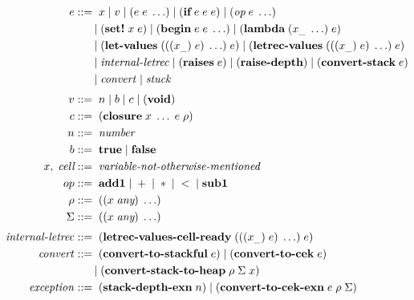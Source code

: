 \begin{figure}[!h]
    \centering
    \fontsize{10.5}{12.5}\selectfont
    \begin{align*}
        e &::=\; x \;|\; v \;|\; (e\; e\;\ldots) \;|\; (\textbf{if}\; e\; e\; e) \;|\; (\textit{op}\; e\;\ldots)\\
          &\;\hspace*{1.5em}|\; (\textbf{set!}\; x\; e) \;|\; (\textbf{begin}\; e\; e\;\ldots) \;|\; (\textbf{lambda}\; (x_{\_}\;\ldots)\; e)\\
          &\;\hspace*{1.5em}|\; (\textbf{let-values}\; (((x_{\_})\; e)\;\ldots)\; e) \;|\; (\textbf{letrec-values}\; (((x_{\_})\; e)\;\ldots)\; e)\\
          &\;\hspace*{1.5em}|\; \mathit{internal\text{-}letrec} \;|\; (\textbf{raises}\; e) \;|\; (\textbf{raise-depth}) \;|\; (\textbf{convert-stack}\; e)\\
          &\;\hspace*{1.5em}|\; \mathit{convert} \;|\; \mathit{stuck}\\[0.3em]
        v &::=\; n \;|\; b \;|\; c \;|\; (\textbf{void})\\
        c &::=\; (\textbf{closure}\; x\;\ldots\; e\; \rho)\\
        n &::=\; \textit{number}\\
        b &::=\; \textbf{true} \;|\; \textbf{false}\\
        x,\; \textit{cell} &::=\; \textit{variable-not-otherwise-mentioned}\\
        op &::=\; \textbf{add1} \;|\; + \;|\; * \;|\; < \;|\; \textbf{sub1}\\
        \rho &::=\; ((x\; \textit{any})\;\ldots)\\
        \Sigma &::=\; ((x\; \textit{any})\;\ldots)\\[0.3em]
        \mathit{internal\text{-}letrec} &::=\; (\textbf{letrec-values-cell-ready}\; (((x_{\_})\; e)\;\ldots)\; e)\\
        \mathit{convert} &::=\; (\textbf{convert-to-stackful}\; e) \;|\; (\textbf{convert-to-cek}\; e)\\
                        &\;\hspace*{1.5em}|\; (\textbf{convert-stack-to-heap}\; \rho\; \Sigma\; x)\\
        \mathit{exception} &::=\; (\textbf{stack-depth-exn}\; n) \;|\; (\textbf{convert-to-cek-exn}\; e\; \rho\; \Sigma)\\

\end{align*}
\end{figure}
